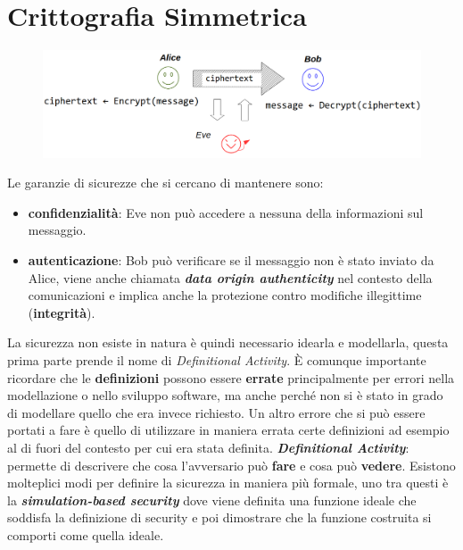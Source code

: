 \chapter{Crittografia Simmetrica}

\begin{figure}[h]
    \centering
    \includegraphics[width=\textwidth]{img/crypto_symm_1.png}
\end{figure}

Le garanzie di sicurezze che si cercano di mantenere sono:
\begin{itemize}[nosep]
    \item \textbf{confidenzialità}: Eve non può accedere a nessuna della informazioni sul messaggio.
    \item \textbf{autenticazione}: Bob può verificare se il messaggio non è stato inviato da Alice, viene anche chiamata \textbf{\textit{data origin authenticity}} nel contesto della comunicazioni e implica anche la protezione contro modifiche illegittime (\textbf{integrità}).
\end{itemize}

\begin{flushleft}
    La sicurezza non esiste in natura è quindi necessario idearla e modellarla, questa prima parte prende il nome di \textit{Definitional Activity}. È comunque importante ricordare che le \textbf{definizioni} possono essere \textbf{errate} principalmente per errori nella modellazione o nello sviluppo software, ma anche perché non si è stato in grado di modellare quello che era invece richiesto. Un altro errore che si può essere portati a fare è quello di utilizzare in maniera errata certe definizioni ad esempio al di fuori del contesto per cui era stata definita. \newline
    \textbf{\textit{Definitional Activity}}: permette di descrivere che cosa l'avversario può \textbf{fare} e cosa può \textbf{vedere}. Esistono molteplici modi per definire la sicurezza in maniera più formale, uno tra questi è la \textbf{\textit{simulation-based security}} dove viene definita una funzione ideale che soddisfa la definizione di security e poi dimostrare che la funzione costruita si comporti come quella ideale.
\end{flushleft}


